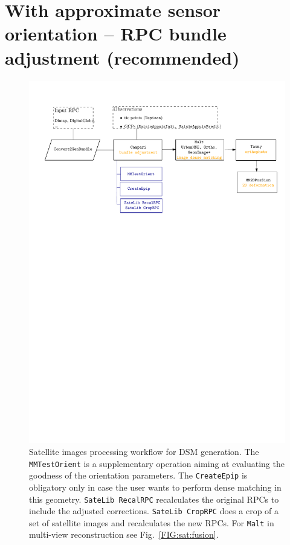 \section{With approximate sensor orientation -- RPC bundle adjustment (recommended)}\label{sec:rpcBundle}
\begin{figure}[h!]
\centering 
\includegraphics[width=0.99\linewidth]{FIGS/Satellites/usingSatellites.pdf}
\caption{ Satellite images processing workflow for DSM generation. The {\tt MMTestOrient} is a supplementary operation aiming at evaluating the goodness of the orientation parameters. The {\tt CreateEpip} is obligatory only in case the user wants to perform dense matching in this geometry. {\tt{SateLib RecalRPC}} recalculates the original RPCs to include the adjusted corrections.  {\tt{SateLib CropRPC}} does a crop of a set of satellite images and recalculates the new RPCs. For {\tt{Malt}} in multi-view reconstruction see Fig.~\ref{FIG:sat:fusion}. }\label{FIG:sat:func}
\end{figure}
